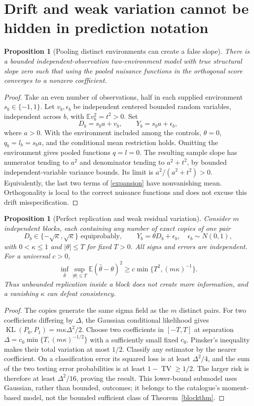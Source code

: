 \documentclass[11pt]{article}
\newtheorem{proposition}[theorem]{Proposition}
\theoremstyle{remark}
\newcommand{\E}{\mathbb E}
\newcommand{\TV}{\operatorname{TV}}
\newcommand{\KL}{\operatorname{KL}}
\begin{document}
\section{Drift and weak variation cannot be hidden in prediction notation}
\begin{proposition}[Pooling distinct environments can create a false slope]
There is a bounded independent-observation two-environment model with true structural slope zero such that using the pooled nuisance functions in the orthogonal score converges to a nonzero coefficient.
\end{proposition}
\begin{proof}
Take an even number of observations, half in each supplied environment $s_b\in\{-1,1\}$. Let $v_b,\epsilon_b$ be independent centered bounded random variables, independent across $b$, with $\E v_b^2=t^2>0$. Set
\[
 D_b=s_ba+v_b,\qquad Y_b=s_ba+\epsilon_b,
\]
where $a>0$. With the environment included among the controls, $\theta=0$, $q_b=l_b=s_ba$, and the conditional mean restriction holds. Omitting the environment gives pooled functions $q=l=0$. The resulting sample slope has numerator tending to $a^2$ and denominator tending to $a^2+t^2$, by bounded independent-variable variance bounds. Its limit is $a^2/(a^2+t^2)>0$. Equivalently, the last two terms of \eqref{expansion} have nonvanishing mean. Orthogonality is local to the correct nuisance functions and does not excuse this drift misspecification.
\end{proof}

\begin{proposition}[Perfect replication and weak residual variation]
Consider $m$ independent blocks, each containing any number of exact copies of one pair
\[
 D_b\in\{-\sqrt\kappa,\sqrt\kappa\}\text{ equiprobably},\qquad
 Y_b=\theta D_b+\epsilon_b,\quad\epsilon_b\sim N(0,1),
\]
with $0<\kappa\leq1$ and $|\theta|\leq T$ for fixed $T>0$. All signs and errors are independent. For a universal $c>0$,
\[
 \inf_{\widehat\theta}\sup_{|\theta|\leq T}
  \E(\widehat\theta-\theta)^2
       \geq c\min\{T^2,(m\kappa)^{-1}\}.
\]
Thus unbounded replication inside a block does not create more information, and a vanishing $\kappa$ can defeat consistency.
\end{proposition}
\begin{proof}
The copies generate the same sigma field as the $m$ distinct pairs. For two coefficients differing by $\Delta$, the Gaussian conditional likelihood gives $\KL(P_0,P_1)=m\kappa\Delta^2/2$. Choose two coefficients in $[-T,T]$ at separation $\Delta=c_0\min\{T,(m\kappa)^{-1/2}\}$ with a sufficiently small fixed $c_0$. Pinsker's inequality makes their total variation at most $1/2$. Classify any estimator by the nearer coefficient. On a classification error its squared loss is at least $\Delta^2/4$, and the sum of the two testing error probabilities is at least $1-\TV\geq1/2$. The larger risk is therefore at least $\Delta^2/16$, proving the result. This lower-bound submodel uses Gaussian, rather than bounded, outcomes; it belongs to the catalogue's moment-based model, not the bounded sufficient class of Theorem~\ref{blockthm}.
\end{proof}
\end{document}
